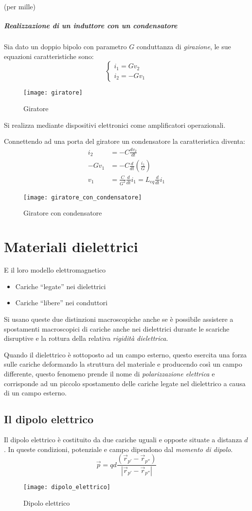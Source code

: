(per mille)
\newpage
\subparagraph{Realizzazione di un induttore con un condensatore}
Sia dato un doppio bipolo con parametro $G$ conduttanza di
\textit{girazione}, le sue equazioni caratteristiche sono:
$$
\begin{cases}
i_1 = G v_2\\
i_2 = -G v_1
\end{cases}
$$
\begin{figure}[H]
\centering
\texttt{[image: giratore]}
\caption{Giratore}
\end{figure}
Si realizza mediante dispositivi elettronici come 
amplificatori operazionali.

Connettendo ad una porta del giratore un condensatore la 
caratteristica diventa:
$$
\begin{aligned}
i_2 &= -C \frac{dv_2}{dt}\\
-Gv_1 &= -C\frac{d}{dt}\left(\frac{i_1}{G}\right)\\
v_1 &= \frac{C}{G^2}\frac{d}{dt}i_1 = L_{eq} \frac{d}{dt}i_1
\end{aligned}
$$
\begin{figure}[H]
\centering
\texttt{[image: giratore\_con\_condensatore]}
\caption{Giratore con condensatore}
\end{figure}
\newpage
\section{Materiali dielettrici}
E il loro modello elettromagnetico

\begin{itemize}
 \item Cariche ``legate'' nei dielettrici
 \item Cariche ``libere'' nei conduttori
\end{itemize}
Si usano queste due distinzioni macroscopiche anche se è possibile
assistere a spostamenti macroscopici di cariche anche nei dielettrici
durante le scariche disruptive e la rottura della relativa 
\textit{rigidità dielettrica}.

Quando il dielettrico è sottoposto ad un campo esterno, questo esercita 
una forza sulle cariche deformando la struttura del materiale e 
producendo così un campo differente, questo fenomeno prende il nome
di \textit{polarizzazione elettrica} e corrisponde ad un piccolo
spostamento delle cariche legate nel dielettrico a causa di un campo
esterno.
\subsection{Il dipolo elettrico}
Il dipolo elettrico è costituito da due cariche uguali e opposte
situate a distanza $d$. In queste condizioni, potenziale e campo 
dipendono dal \textit{momento di dipolo}.
$$
\vec{p} = qd \frac{(\vec{r}_{p'}-\vec{r}_{p''})}{|\vec{r}_{p'}-\vec{r}_{p''}|}
$$
\begin{figure}[H]
\centering
\texttt{[image: dipolo\_elettrico]}
\caption{Dipolo elettrico}
\end{figure}

